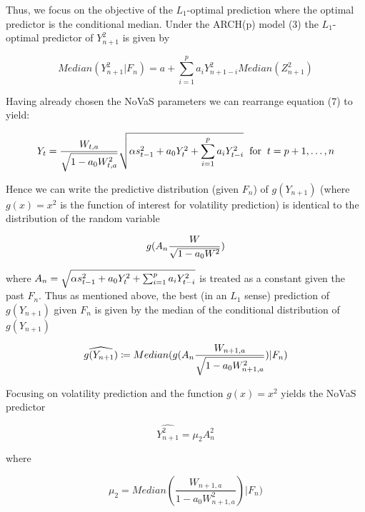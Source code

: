 \documentclass[11pt,]{article}
\begin{document}
Thus, we focus on the objective of the $L_1$-optimal prediction where the optimal predictor is the conditional median. Under the ARCH(p) model (3) the $L_1$-optimal predictor of $Y_{n+1}^2$ is given by

\begin{equation}
Median(Y_{n+1}^2|F_n) = a + \sum_{i=1}^p a_i Y_{n+1-i}^2 Median(Z_{n+1}^2)
\end{equation}

Having already chosen the NoVaS parameters we can rearrange equation (7) to yield:

\begin{equation}
Y_t = \frac{W_{t,a}}{\sqrtsign{1-a_0 W_{t,a}^2}} \sqrtsign{\alpha s_{t-1}^2 + a_{0} Y_{t}^2 + \sum_{i=1}^p a_i Y_{t-i}^2} \hspace{0.2cm} \text{for} \hspace{0.2cm} t = p+1,\dots, n
\end{equation}

Hence we can write the predictive distribution (given $F_n$) of $g(Y_{n+1})$ (where $g(x)=x^2$ is the function of interest for volatility prediction) is identical to the distribution of the random variable

\begin{equation}
g(A_n \frac{W}{\sqrtsign{1 - a_0W^2}})
\end{equation}

where $A_n = \sqrtsign{\alpha s_{t-1}^2 + a_{0} Y_{t}^2 + \sum_{i=1}^p a_i Y_{t-i}^2}$ is treated as a constant given the past $F_n$. Thus as mentioned above, the best (in an $L_1$ sense) prediction of $g(Y_{n+1})$ given $F_n$ is given by the median of the conditional distribution of $g(Y_{n+1})$

\begin{equation}
\widehat{g(Y_{n+1})} \coloneqq Median(g(A_n \frac{W_{n+1,a}}{\sqrtsign{1 - a_0W_{n+1,a}^2}})|F_{n})
\end{equation}

Focusing on volatility prediction and the function $g(x)=x^2$ yields the NoVaS predictor

\begin{equation}
\widehat{Y_{n+1}^2} = \mu_{2}A_{n}^2
\end{equation}

where

\begin{equation}
\mu_{2} = Median(\frac{W_{n+1,a}}{1 - a_0W_{n+1,a}^2})|F_{n})
\end{equation}
\end{document}
